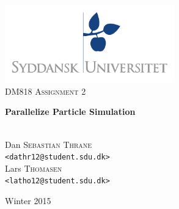 \documentclass[a4paper,11pt,oneside]{book}
\title{}
\author{}
\date{}
\begin{document}
\begin{titlepage}
\begin{center}

\thispagestyle{empty}
\includegraphics[width=0.55\textwidth]{logo.pdf}\\[1cm]    
\textsc{\Large DM818 Assignment 2}\\[0.5cm]

\begin{Huge}
\textbf{Parallelize Particle Simulation}
\end{Huge}

\vspace{4cm}

\begin{minipage}{1\textwidth}
\begin{center}
\emph{}\\

Dan \textsc{Sebastian Thrane}\\
\verb!<dathr12@student.sdu.dk>!\\

Lars \textsc{Thomasen}\\
\verb!<latho12@student.sdu.dk>!\\

\end{center}
\end{minipage}
\begin{minipage}{0.4\textwidth}
\end{minipage}

\vfill

{\large Winter 2015}\\

\end{center}
\end{titlepage}

\renewcommand{\contentsname}{Table of Contents}
\tableofcontents
\thispagestyle{empty}
\end{document}
